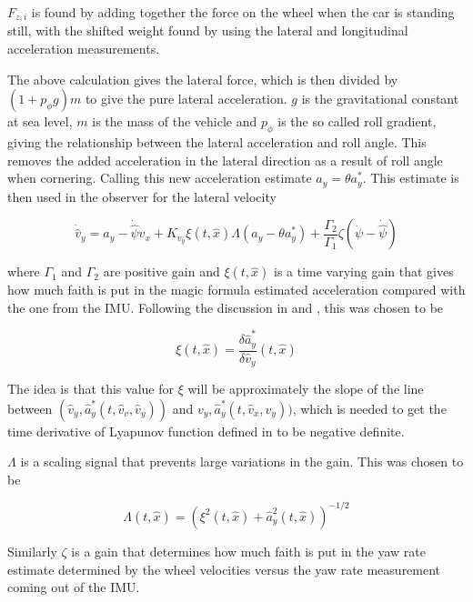 $F_{z,i}$ is found by adding together the force on the wheel when the car is standing still, with the shifted weight found by using the lateral and longitudinal acceleration measurements.  

The above calculation gives the lateral force, which is then divided by $(1 + p_{\phi}g)m$ to give the pure lateral acceleration. $g$ is the gravitational constant at sea level, $m$ is the mass of the vehicle and $p_{\phi}$ is the so called roll gradient, giving the relationship between the lateral acceleration and roll angle. This removes the added acceleration in the lateral direction as a result of roll angle when cornering. Calling this new acceleration estimate $a_y = \theta a_y^*$. This estimate is then used in the observer for the lateral velocity

\begin{equation}
    \dot{\hat{v}}_y = a_y - \dot{\hat{\psi}}\hat{v}_x + K_{v_y}\xi(t,\hat{x})\Lambda(a_y - \theta a_y^{*}) + \frac{\Gamma_2}{\Gamma_1}\zeta(\dot{\psi} - \dot{\hat{\psi}})
\end{equation}

where $\Gamma_1$ and $\Gamma_2$ are positive gain and $\xi(t,\hat{x})$ is a time varying gain that gives how much faith is put in the magic formula estimated acceleration compared with the one from the \gls{IMU}. Following the discussion in \cite{MainStateEst} and \cite{FossenGrip2007}, this was chosen to be

\begin{equation}
    \xi(t,\hat{x}) = \frac{\delta \hat{a}_y^*}{\delta \hat{v}_y}(t,\hat{x})
\end{equation}

The idea is that this value for $\xi$ will be approximately the slope of the line between $(\hat{v}_y,\hat{a}_y^*(t,\hat{v}_v,\hat{v}_y))$ and $v_y,\hat{a}_y^*(t,\hat{v}_x,v_y))$, which is needed to get the time derivative of Lyapunov function defined in \cite{FossenGrip2007} to be negative definite.

$\Lambda$ is a scaling signal that prevents large variations in the gain. This was chosen to be

\begin{equation}
    \Lambda(t,\hat{x}) = (\xi^2(t,\hat{x}) + \hat{a}_y^2(t,\hat{x}))^{-1/2}
\end{equation}

Similarly $\zeta$ is a gain that determines how much faith is put in the yaw rate estimate determined by the wheel velocities versus the yaw rate measurement coming out of the IMU.

